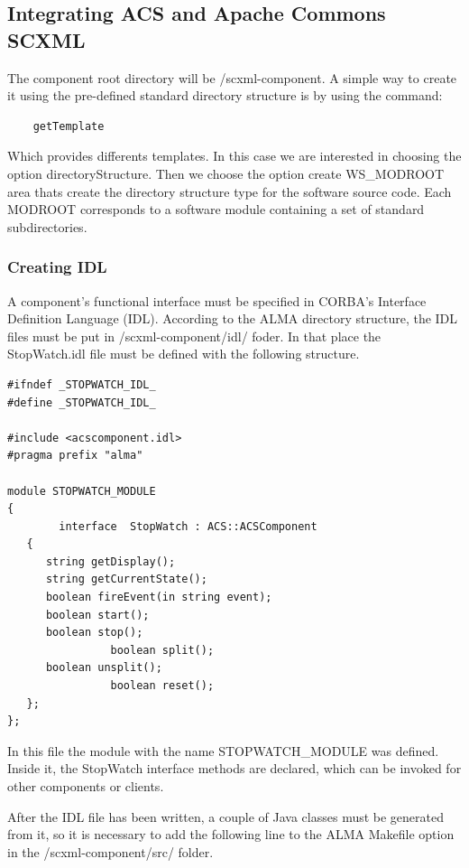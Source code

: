 \documentclass[]{article}
\begin{document}
\subsection{Integrating ACS and Apache Commons SCXML}

The component root directory will be \textsf{/scxml-component}. A simple way to create it using the pre-defined standard directory structure is by using the command: 

\begin{lstlisting}
	getTemplate 
\end{lstlisting}	

Which provides differents templates. In this case we are interested in choosing the option directoryStructure. Then we choose the option create \textsf{WS\_MODROOT} area thats create the directory structure type for the software source code. Each \textsf{MODROOT} corresponds to a software module containing a set of standard subdirectories. 

\subsubsection{Creating IDL}

A component’s functional interface must be specified in CORBA’s Interface Definition Language (IDL). According to the ALMA directory structure, the IDL files must be put in \textsf{/scxml-component/idl/} foder. In that place the StopWatch.idl file must be defined with the following structure. 


\begin{lstlisting}
#ifndef _STOPWATCH_IDL_
#define _STOPWATCH_IDL_

#include <acscomponent.idl>
#pragma prefix "alma"

module STOPWATCH_MODULE
{
        interface  StopWatch : ACS::ACSComponent
   {
      string getDisplay();
      string getCurrentState();
      boolean fireEvent(in string event);
      boolean start();
      boolean stop();
                boolean split();
      boolean unsplit();
                boolean reset();
   };
};

\end{lstlisting}	

In this file the module with the name \textsf{STOPWATCH\_MODULE} was defined. Inside it, the StopWatch interface methods are declared, which can be invoked for other components or clients.

After the IDL file has been written, a couple of Java classes must be generated from it, so it is necessary to add the following line to the ALMA Makefile option in the \textsf{/scxml-component/src/} folder. 
\end{document}
